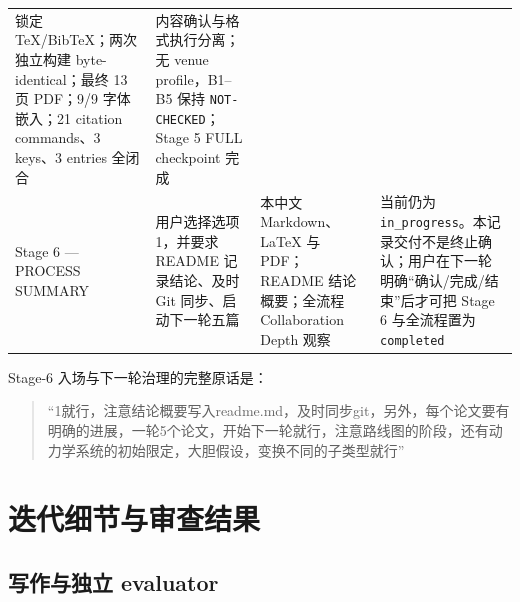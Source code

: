\documentclass[12pt,a4paper]{article}
\begin{document}
\begin{longtable}[]{@{}llll@{}}
\begin{minipage}[t]{0.22\columnwidth}
锁定 TeX/BibTeX；两次独立构建 byte-identical；最终 13 页 PDF；9/9
字体嵌入；21 citation commands、3 keys、3 entries 全闭合\strut
\end{minipage} & \begin{minipage}[t]{0.22\columnwidth}\raggedright
内容确认与格式执行分离；无 venue profile，B1--B5 保持
\texttt{NOT-CHECKED}；Stage 5 FULL checkpoint 完成\strut
\end{minipage}\tabularnewline
\begin{minipage}[t]{0.22\columnwidth}\raggedright
Stage 6 --- PROCESS SUMMARY\strut
\end{minipage} & \begin{minipage}[t]{0.22\columnwidth}\raggedright
用户选择选项 1，并要求 README 记录结论、及时 Git
同步、启动下一轮五篇\strut
\end{minipage} & \begin{minipage}[t]{0.22\columnwidth}\raggedright
本中文 Markdown、LaTeX 与 PDF；README 结论概要；全流程 Collaboration
Depth 观察\strut
\end{minipage} & \begin{minipage}[t]{0.22\columnwidth}\raggedright
当前仍为
\texttt{in\_progress}。本记录交付不是终止确认；用户在下一轮明确``确认/完成/结束''后才可把
Stage 6 与全流程置为 \texttt{completed}\strut
\end{minipage}\tabularnewline
\bottomrule
\end{longtable}

Stage-6 入场与下一轮治理的完整原话是：

\begin{quote}
``1就行，注意结论概要写入readme.md，及时同步git，另外，每个论文要有明确的进展，一轮5个论文，开始下一轮就行，注意路线图的阶段，还有动力学系统的初始限定，大胆假设，变换不同的子类型就行''
\end{quote}

\hypertarget{ux8fedux4ee3ux7ec6ux8282ux4e0eux5ba1ux67e5ux7ed3ux679c}{%
\section{迭代细节与审查结果}\label{ux8fedux4ee3ux7ec6ux8282ux4e0eux5ba1ux67e5ux7ed3ux679c}}

\hypertarget{ux5199ux4f5cux4e0eux72ecux7acb-evaluator}{%
\subsection{写作与独立
evaluator}\label{ux5199ux4f5cux4e0eux72ecux7acb-evaluator}}
\end{document}

